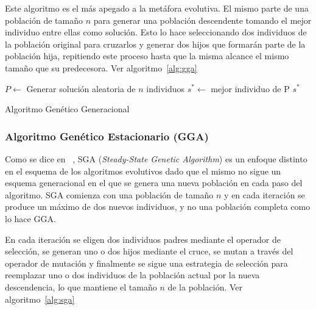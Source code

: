 \documentclass{ci5652}
\begin{document}
Este algoritmo es el más apegado a la metáfora evolutiva. El mismo parte de una población de tamaño $n$ para generar una población descendente tomando el mejor individuo entre ellas como solución. Esto lo hace seleccionando dos individuos de la población original para cruzarlos y generar dos hijos que formarán parte de la población hija, repitiendo este proceso hasta que la misma alcance el mismo tamaño que su predecesora. Ver algoritmo~\ref{alg:gga}


\begin{algorithm}[!h]
    \DontPrintSemicolon
    \vspace*{0.1cm}

	$P \leftarrow $ Generar solución aleatoria de $n$ individuos\;
	$s^{*} \leftarrow $ mejor individuo de P\;
	\Return $s^{*}$    
    \vspace*{0.1cm}
    \caption{Algoritmo Genético Generacional}
    \label{alg:gga}
\end{algorithm}
  
\subsubsection{Algoritmo Genético Estacionario (GGA)}

Como se dice en ~\cite{whitley1988genitor}, SGA (\textit{Steady-State Genetic Algorithm}) es un enfoque distinto en el esquema de los algoritmos evolutivos dado que el mismo no sigue un esquema generacional en el que se genera una nueva población en cada paso del algoritmo. SGA comienza con una población de tamaño $n$ y en cada iteración se produce un máximo de dos nuevos individuos, y no una población completa como lo hace GGA.

En cada iteración se eligen dos individuos padres mediante el operador de selección, se generan uno o dos hijos mediante el cruce, se mutan a través del operador de mutación y finalmente se sigue una estrategia de selección para reemplazar uno o dos individuos de la población actual por la nueva descendencia, lo que mantiene el tamaño $n$ de la población. Ver algoritmo~\ref{alg:sga}
\end{document}
